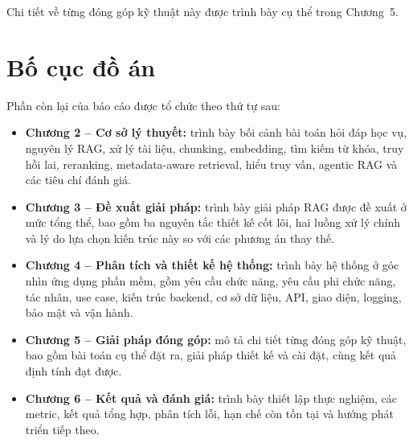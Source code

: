 \documentclass[../DoAn.tex]{subfiles}
\begin{document}
Chi tiết về từng đóng góp kỹ thuật này được trình bày cụ thể trong Chương~5.

\section{Bố cục đồ án}
\label{sec:bocuc}

Phần còn lại của báo cáo được tổ chức theo thứ tự sau:

\begin{itemize}
    \item \textbf{Chương 2 -- Cơ sở lý thuyết:} trình bày bối cảnh bài toán
    hỏi đáp học vụ, nguyên lý RAG, xử lý tài liệu, chunking, embedding, tìm
    kiếm từ khóa, truy hồi lai, reranking, metadata-aware retrieval, hiểu truy
    vấn, agentic RAG và các tiêu chí đánh giá.

    \item \textbf{Chương 3 -- Đề xuất giải pháp:} trình bày giải pháp RAG được
    đề xuất ở mức tổng thể, bao gồm ba nguyên tắc thiết kế cốt lõi, hai luồng
    xử lý chính và lý do lựa chọn kiến trúc này so với các phương án thay thế.

    \item \textbf{Chương 4 -- Phân tích và thiết kế hệ thống:} trình bày hệ
    thống ở góc nhìn ứng dụng phần mềm, gồm yêu cầu chức năng, yêu cầu phi
    chức năng, tác nhân, use case, kiến trúc backend, cơ sở dữ liệu, API, giao
    diện, logging, bảo mật và vận hành.

    \item \textbf{Chương 5 -- Giải pháp đóng góp:} mô tả chi tiết từng đóng
    góp kỹ thuật, bao gồm bài toán cụ thể đặt ra, giải pháp thiết kế và cài
    đặt, cùng kết quả định tính đạt được.

    \item \textbf{Chương 6 -- Kết quả và đánh giá:} trình bày thiết lập thực
    nghiệm, các metric, kết quả tổng hợp, phân tích lỗi, hạn chế còn tồn tại
    và hướng phát triển tiếp theo.
\end{itemize}
\end{document}
